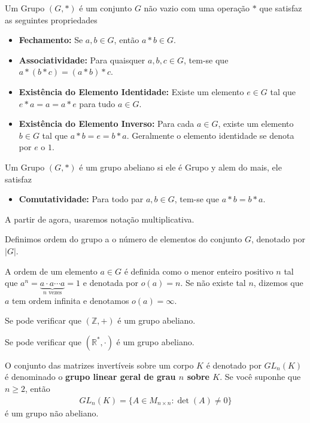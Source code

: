 \begin{definition}[Grupo]
  Um Grupo $(G,*)$ é um conjunto $G$ não vazio com uma operação $*$ que satisfaz as seguintes propriedades
\begin{itemize}
  \item \textbf{Fechamento:} Se $a,b\in G$, então $a*b\in G$.
  \item \textbf{Associatividade:} Para quaisquer $a,b,c\in G$, tem-se que $a*(b*c)=(a*b)*c$.
  \item \textbf{Existência do Elemento Identidade:} Existe um elemento $e\in G$ tal que $e*a=a=a*e$ para tudo $a\in G$.
  \item \textbf{Existência do Elemento Inverso:} Para cada $a\in G$, existe um elemento $b\in G$ tal que $a*b=e=b*a$. Geralmente o elemento identidade se denota por $e$ o $1$. 
\end{itemize}
\end{definition}
\begin{definition}
  Um Grupo $(G,*)$ é um grupo abeliano si ele é Grupo y alem do mais, ele satisfaz
  \begin{itemize}
    \item \textbf{Comutatividade:} Para todo par $a,b\in G$, tem-se que $a*b=b*a$.
  \end{itemize}
\end{definition}
A partir de agora, usaremos notação multiplicativa.
\begin{definition}
  Definimos ordem do grupo a o número de elementos do conjunto $G$, denotado por $|G|$. 
\end{definition}
\begin{definition}
  A ordem de um elemento $a\in G$ é definida como o menor enteiro positivo $n$ tal que $a^{n}=\underbrace{a\cdot a\cdots a}_{n \text{ vezes}}=1$ e denotada por $o(a)=n$. Se não existe tal $n$, dizemos que $a$ tem ordem infinita e denotamos $o(a)=\infty$. 
\end{definition}
\begin{example}
  Se pode verificar que $(\mathbb{Z},+)$ é um grupo abeliano. 
\end{example}
\begin{example}
  Se pode verificar que $(\mathbb{R}^{*},\cdot)$ é um grupo abeliano. 
\end{example}
\begin{example}[$GL_n$]
  O conjunto das matrizes invertíveis sobre um corpo $K$ é denotado por $GL_n(K)$ é denominado o \textbf{grupo linear geral de grau $n$ sobre $K$}. Se você suponhe que $n\geq 2$, então
  \begin{align*}
    GL_n(K)=\{A\in M_{n\times n}: \det(A)\neq 0\}
  \end{align*}
  é um grupo não abeliano.
\end{example}
